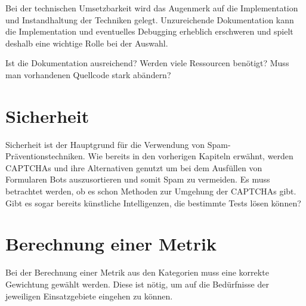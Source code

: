 Bei der technischen Umsetzbarkeit wird das Augenmerk auf die Implementation und Instandhaltung der Techniken gelegt. 
Unzureichende Dokumentation kann die Implementation und eventuelles Debugging erheblich erschweren 
und spielt deshalb eine wichtige Rolle bei der Auswahl. 

Ist die Dokumentation ausreichend? Werden viele Ressourcen benötigt? Muss man vorhandenen Quellcode stark abändern?

\section{Sicherheit}
\label{ch:matrix:sicherheit}
Sicherheit ist der Hauptgrund für die Verwendung von Spam-Präventionstechniken. 
Wie bereits in den vorherigen Kapiteln erwähnt, werden CAPTCHAs und ihre Alternativen genutzt um bei dem Ausfüllen von Formularen Bots auszusortieren
und somit Spam zu vermeiden.
Es muss betrachtet werden, ob es schon Methoden zur Umgehung der CAPTCHAs gibt. 
Gibt es sogar bereits künstliche Intelligenzen, die bestimmte Tests lösen können?

\section{Berechnung einer Metrik}
\label{ch:matrix:berechnung}
Bei der Berechnung einer Metrik aus den Kategorien muss eine korrekte Gewichtung gewählt werden. 
Diese ist nötig, um auf die Bedürfnisse der jeweiligen Einsatzgebiete eingehen zu können. 



